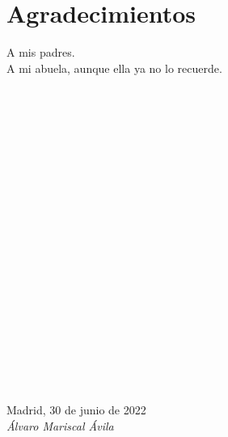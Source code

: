 \cleardoublepage

\chapter*{Agradecimientos}

A mis padres.\\

A mi abuela, aunque ella ya no lo recuerde.\\
\ %


\

\

\

\

\

\

\

\

\

\

\

\begin{flushright}
		\vspace{4.0 cm}
		\vspace{1.0 cm}
		Madrid, 30 de junio de 2022\\
		\emph{Álvaro Mariscal Ávila}
\end{flushright}

\thispagestyle{empty}
